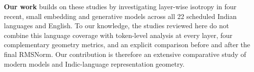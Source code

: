 \textbf{Our work} builds on these studies by investigating layer-wise isotropy in four recent, small embedding and generative models across all 22 scheduled Indian languages and English. To our knowledge, the studies reviewed here do not combine this language coverage with token-level analysis at every layer, four complementary geometry metrics, and an explicit comparison before and after the final RMSNorm. Our contribution is therefore an extensive comparative study of modern models and Indic-language representation geometry.



